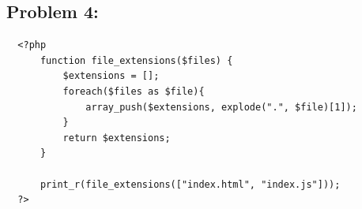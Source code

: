 \documentclass{article}
\begin{document}
\subsection*{Problem 4:}
\begin{verbatim}
  <?php
      function file_extensions($files) {
          $extensions = [];
          foreach($files as $file){
              array_push($extensions, explode(".", $file)[1]);
          }
          return $extensions; 
      }
      
      print_r(file_extensions(["index.html", "index.js"]));
  ?>
\end{verbatim}
\end{document}
